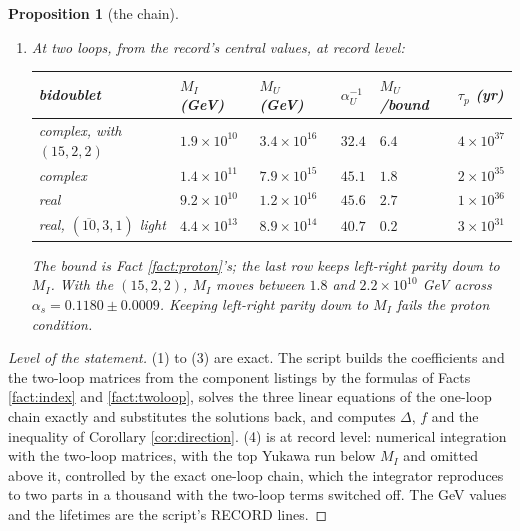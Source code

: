 \documentclass[11pt]{article}
\newtheorem{proposition}[theorem]{Proposition}
\theoremstyle{definition}
\newcommand{\Dl}{\Delta}
\begin{document}
\begin{proposition}[the chain]
\begin{enumerate}
\item[(4)] At two loops, from the record's central values, at record level:
\begin{center}\small
\begin{tabular}{@{}llllll@{}}
\toprule
bidoublet & $M_{I}$ (GeV) & $M_{U}$ (GeV) & $\alpha_{U}^{-1}$ & $M_{U}$/bound & $\tau_{p}$ (yr) \\
\midrule
complex, with $(15,2,2)$ & $1.9 \times 10^{10}$ & $3.4 \times 10^{16}$ & $32.4$ & $6.4$ & $4 \times 10^{37}$ \\
complex & $1.4 \times 10^{11}$ & $7.9 \times 10^{15}$ & $45.1$ & $1.8$ & $2 \times 10^{35}$ \\
real & $9.2 \times 10^{10}$ & $1.2 \times 10^{16}$ & $45.6$ & $2.7$ & $1 \times 10^{36}$ \\
real, $(\overline{10},3,1)$ light & $4.4 \times 10^{13}$ & $8.9 \times 10^{14}$ & $40.7$ & $0.2$ & $3 \times 10^{31}$ \\
\bottomrule
\end{tabular}
\end{center}
The bound is Fact \ref{fact:proton}'s; the last row keeps left-right parity down to $M_{I}$. With the $(15,2,2)$, $M_{I}$ moves between $1.8$ and $2.2 \times 10^{10}$ GeV across $\alpha_{s} = 0.1180 \pm 0.0009$. Keeping left-right parity down to $M_{I}$ fails the proton condition.
\end{enumerate}
\end{proposition}

\begin{proof}[Level of the statement]
(1) to (3) are exact. The script builds the coefficients and the two-loop matrices from the component listings by the formulas of Facts \ref{fact:index} and \ref{fact:twoloop}, solves the three linear equations of the one-loop chain exactly and substitutes the solutions back, and computes $\Dl$, $f$ and the inequality of Corollary \ref{cor:direction}. (4) is at record level: numerical integration with the two-loop matrices, with the top Yukawa run below $M_{I}$ and omitted above it, controlled by the exact one-loop chain, which the integrator reproduces to two parts in a thousand with the two-loop terms switched off. The GeV values and the lifetimes are the script's RECORD lines.
\end{proof}
\end{document}
